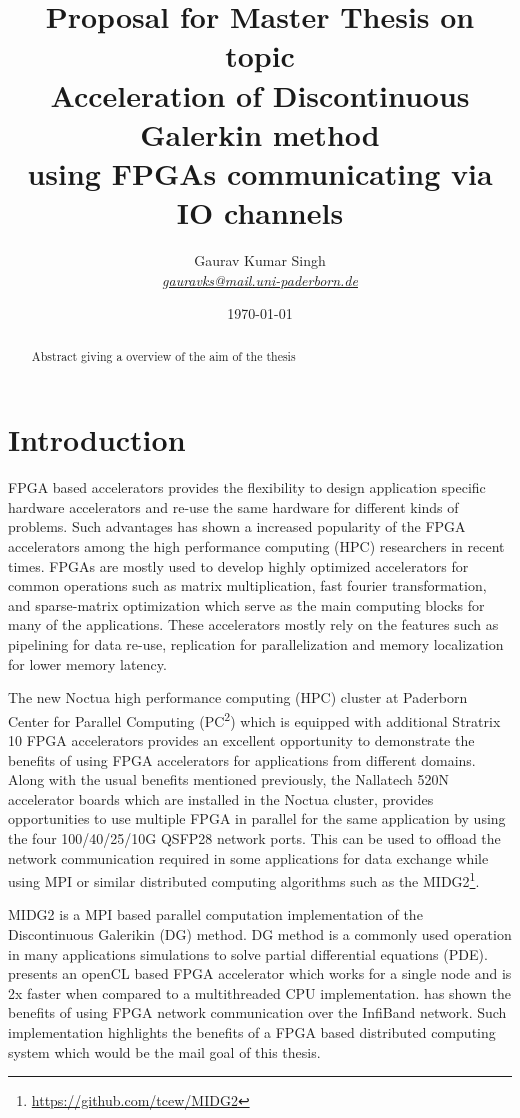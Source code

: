 \documentclass[english,notitlepage]{hgbreport}
\author{Gaurav Kumar Singh \\ \textit{\href{mailto:gauravks@mail.uni-paderborn.de}{gauravks@mail.uni-paderborn.de}}}
\title{Proposal for Master Thesis on topic \\
		Acceleration of Discontinuous Galerkin method \\
		using FPGAs communicating via IO channels}
\date{\today}
\begin{document}
\maketitle

\begin{abstract}\noindent
	Abstract giving a overview of the aim of the thesis
\end{abstract}

\section{Introduction}

FPGA based accelerators provides the flexibility to design application specific hardware accelerators and re-use the same
hardware for different kinds of problems. Such advantages has shown a increased popularity of the FPGA accelerators among
the high performance computing (HPC) researchers in recent times. FPGAs are mostly used to develop highly
optimized accelerators for common operations such as matrix multiplication, fast fourier transformation,
and sparse-matrix optimization which serve as the main computing blocks for many of the applications. These accelerators
mostly rely on the features such as pipelining for data re-use, replication for parallelization and memory localization
for lower memory latency.

The new Noctua high performance computing (HPC) cluster at Paderborn Center for Parallel Computing  (PC\textsuperscript{2})
which is equipped with additional Stratrix 10 FPGA accelerators provides an excellent opportunity to demonstrate the benefits
of using FPGA accelerators for applications from different domains. Along with the usual benefits mentioned previously, the
Nallatech 520N accelerator boards which are installed in the Noctua cluster, provides opportunities to use multiple
FPGA in parallel for the same application by using the four 100/40/25/10G QSFP28 network ports. This can be used to offload
the network communication required in some applications for data exchange while using MPI or similar distributed computing
algorithms such as the MIDG2\footnote{\url{https://github.com/tcew/MIDG2}}.

MIDG2 is a MPI based parallel computation implementation of the Discontinuous Galerikin (DG) \cite{hesthaven_nodal_2008} method.
DG method is a commonly used operation in many applications simulations to solve partial differential equations (PDE).
\textcite{kenter_opencl-based_2018} presents an openCL based FPGA accelerator which works for a single node and is 2x faster
when compared to a multithreaded CPU implementation. \textcite{kobayashi_opencl-ready_2018} has shown the benefits of using
FPGA network communication over the InfiBand network. Such implementation highlights the benefits of a FPGA based distributed
computing system which would be the mail goal of this thesis.
\end{document}

